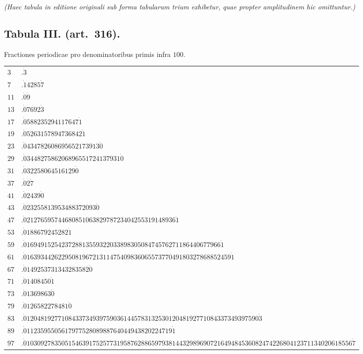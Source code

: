 \documentclass[12pt,a4paper]{article}
\theoremstyle{plain}
\theoremstyle{definition}
\theoremstyle{remark}
\begin{document}
\textit{(Haec tabula in editione originali sub forma tabularum trium
exhibetur, quae propter amplitudinem hic omittuntur.)}

\subsection*{Tabula III. (art.~316).}

Fractiones periodicae pro denominatoribus primis infra $100$.

\medskip

\begin{tabular}{ll}
$3$ & $.\dot{3}$ \\
$7$ & $.
\dot{1}4285\dot{7}$ \\
$11$ & $.
\dot{0}\dot{9}$ \\
$13$ & $.
\dot{0}7692\dot{3}$ \\
$17$ & $.\dot{0}588235294117647\dot{1}$ \\
$19$ & $.
\dot{0}5263157894736842\dot{1}$ \\
$23$ & $.\dot{0}434782608695652173913\dot{0}$ \\
$29$ & $.\dot{0}344827586206896551724137931\dot{0}$ \\
$31$ & $.
\dot{0}32258064516129\dot{0}$ \\
$37$ & $.
\dot{0}2\dot{7}$ \\
$41$ & $.\dot{0}2439\dot{0}$ \\
$43$ & $.
\dot{0}23255813953488372093\dot{0}$ \\
$47$ & $.\dot{0}2127659574468085106382978723404255319148936\dot{1}$ \\
$53$ & $.\dot{0}188679245282\dot{1}$ \\
$59$ & $.\dot{0}16949152542372881355932203389830508474576271186440677966\dot{1}$ \\
$61$ & $.\dot{0}16393442622950819672131147540983606557377049180327868852459\dot{1}$ \\
$67$ & $.\dot{0}149253731343283582\dot{0}$ \\
$71$ & $.\dot{0}1408450\dot{1}$ \\
$73$ & $.\dot{0}1369863\dot{0}$ \\
$79$ & $.\dot{0}126582278481\dot{0}$ \\
$83$ & $.\dot{0}1204819277108433734939759036144578313253012048192771084337349397590\dot{3}$ \\
$89$ & $.\dot{0}112359550561797752808988764044943820224719\dot{1}$ \\
$97$ & $.\dot{0}1030927835051546391752577319587628865979381443298969072164948453608247422680412371134020618556\dot{7}$ \\
\end{tabular}
\end{document}
